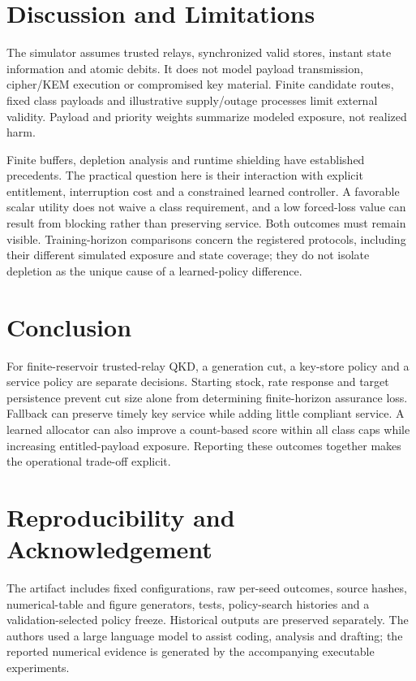 \documentclass[conference,a4paper]{IEEEtran}
\begin{document}
\section{Discussion and Limitations}\label{sec:limits}
The simulator assumes trusted relays, synchronized valid stores, instant state information and atomic debits. It does not model payload transmission, cipher/KEM execution or compromised key material. Finite candidate routes, fixed class payloads and illustrative supply/outage processes limit external validity. Payload and priority weights summarize modeled exposure, not realized harm.

Finite buffers, depletion analysis and runtime shielding have established precedents. The practical question here is their interaction with explicit entitlement, interruption cost and a constrained learned controller. A favorable scalar utility does not waive a class requirement, and a low forced-loss value can result from blocking rather than preserving service. Both outcomes must remain visible. Training-horizon comparisons concern the registered protocols, including their different simulated exposure and state coverage; they do not isolate depletion as the unique cause of a learned-policy difference.

\section{Conclusion}
For finite-reservoir trusted-relay QKD, a generation cut, a key-store policy and a service policy are separate decisions. Starting stock, rate response and target persistence prevent cut size alone from determining finite-horizon assurance loss. Fallback can preserve timely key service while adding little compliant service. A learned allocator can also improve a count-based score within all class caps while increasing entitled-payload exposure. Reporting these outcomes together makes the operational trade-off explicit.

\section*{Reproducibility and Acknowledgement}
The artifact includes fixed configurations, raw per-seed outcomes, source hashes, numerical-table and figure generators, tests, policy-search histories and a validation-selected policy freeze. Historical outputs are preserved separately. The authors used a large language model to assist coding, analysis and drafting; the reported numerical evidence is generated by the accompanying executable experiments.
\end{document}
